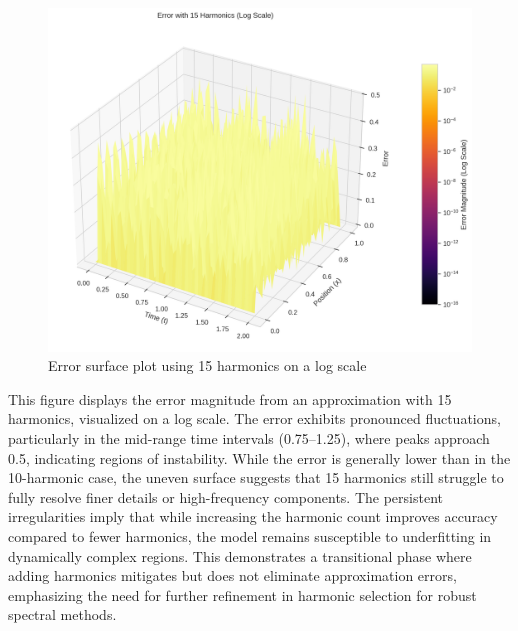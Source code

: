 \documentclass[preprint,12pt]{elsarticle}
\begin{document}
\begin{figure}[t]  
    \centering  
    \includegraphics[width=0.9\linewidth]{figures/3d_comparison_error_15h.png}  
    \caption{Error surface plot using 15 harmonics on a log scale}  
    \label{fig:error_15h}  
\end{figure}  

This figure displays the error magnitude from an approximation with 15 harmonics, visualized on a log scale. The error exhibits pronounced fluctuations, particularly in the mid-range time intervals (0.75–1.25), where peaks approach 0.5, indicating regions of instability. While the error is generally lower than in the 10-harmonic case, the uneven surface suggests that 15 harmonics still struggle to fully resolve finer details or high-frequency components. The persistent irregularities imply that while increasing the harmonic count improves accuracy compared to fewer harmonics, the model remains susceptible to underfitting in dynamically complex regions. This demonstrates a transitional phase where adding harmonics mitigates but does not eliminate approximation errors, emphasizing the need for further refinement in harmonic selection for robust spectral methods.  
\end{document}
